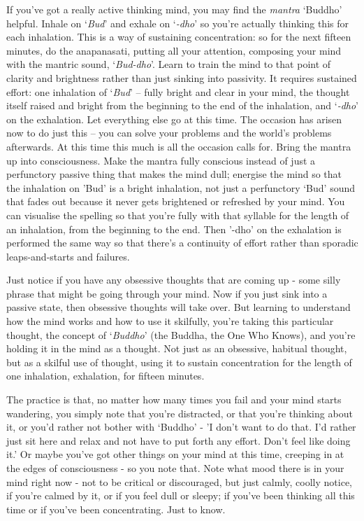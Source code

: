 
If you've got a really active thinking mind, you may find the \textit{mantra} `Buddho' helpful. Inhale on `\textit{Bud}' and exhale on `\textit{-dho}' so you're actually thinking this for each inhalation. This is a way of sustaining concentration: so for the next fifteen minutes, do the anapanasati, putting all your attention, composing your mind with the mantric sound, `\textit{Bud-dho}'. Learn to train the mind to that point of clarity and brightness rather than just sinking into passivity. It requires sustained effort: one inhalation of `\textit{Bud}' -- fully bright and clear in your mind, the thought itself raised and bright from the beginning to the end of the inhalation, and `\textit{-dho}' on the exhalation. Let everything else go at this time. The occasion has arisen now to do just this -- you can solve your problems and the world's problems afterwards. At this time this much is all the occasion calls for. Bring the mantra up into consciousness. Make the mantra fully conscious instead of just a perfunctory passive thing that makes the mind dull; energise the mind so that the inhalation on 'Bud' is a bright inhalation, not just a perfunctory `Bud' sound that fades out because it never gets brightened or refreshed by your mind. You can visualise the spelling so that you're fully with that syllable for the length of an inhalation, from the beginning to the end. Then '-dho' on the exhalation is performed the same way so that there's a continuity of effort rather than sporadic leaps-and-starts and failures.

Just notice if you have any obsessive thoughts that are coming up - some silly phrase that might be going through your mind. Now if you just sink into a passive state, then obsessive thoughts will take over. But learning to understand how the mind works and how to use it skilfully, you're taking this particular thought, the concept of `\textit{Buddho}' (the Buddha, the One Who Knows), and you're holding it in the mind as a thought. Not just as an obsessive, habitual thought, but as a skilful use of thought, using it to sustain concentration for the length of one inhalation, exhalation, for fifteen minutes. 

The practice is that, no matter how many times you fail and your mind starts wandering, you simply note that you're distracted, or that you're thinking about it, or you'd rather not bother with `Buddho' - 'I don't want to do that. I'd rather just sit here and relax and not have to put forth any effort. Don't feel like doing it.' Or maybe you've got other things on your mind at this time, creeping in at the edges of consciousness - so you note that. Note what mood there is in your mind right now - not to be critical or discouraged, but just calmly, coolly notice, if you're calmed by it, or if you feel dull or sleepy; if you've been thinking all this time or if you've been concentrating. Just to know.

